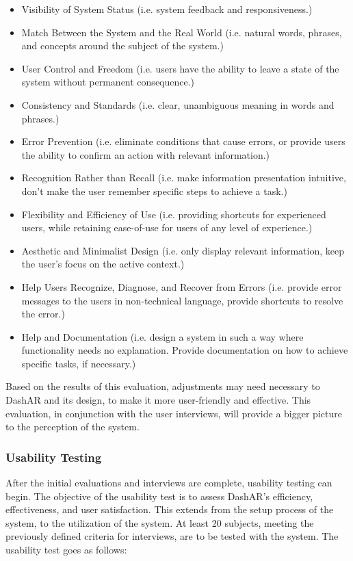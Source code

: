                 \begin{itemize}
                    \item Visibility of System Status (i.e. system feedback and responsiveness.)
                    \item Match Between the System and the Real World (i.e. natural words, phrases, and concepts around the subject of the system.)
                    \item User Control and Freedom (i.e. users have the ability to leave a state of the system without permanent consequence.)
                    \item Consistency and Standards (i.e. clear, unambiguous meaning in words and phrases.)
                    \item Error Prevention (i.e. eliminate conditions that cause errors, or provide users the ability to confirm an action with relevant information.)
                    \item Recognition Rather than Recall (i.e. make information presentation intuitive, don't make the user remember specific steps to achieve a task.)
                    \item Flexibility and Efficiency of Use (i.e. providing shortcuts for experienced users, while retaining ease-of-use for users of any level of experience.)
                    \item Aesthetic and Minimalist Design (i.e. only display relevant information, keep the user's focus on the active context.)
                    \item Help Users Recognize, Diagnose, and Recover from Errors (i.e. provide error messages to the users in non-technical language, provide shortcuts to resolve the error.)
                    \item Help and Documentation (i.e. design a system in such a way where functionality needs no explanation. Provide documentation on how to achieve specific tasks, if necessary.)
                \end{itemize}

                \par Based on the results of this evaluation, adjustments may need necessary to DashAR and its design, to make it more user-friendly and effective. This evaluation, in conjunction with the user interviews, will provide a bigger picture to the perception of the system.

            \subsubsection{Usability Testing}
                \par After the initial evaluations and interviews are complete, usability testing can begin. The objective of the usability test is to assess DashAR's efficiency, effectiveness, and user satisfaction. This extends from the setup process of the system, to the utilization of the system. At least 20 subjects, meeting the previously defined criteria for interviews, are to be tested with the system. The usability test goes as follows:

